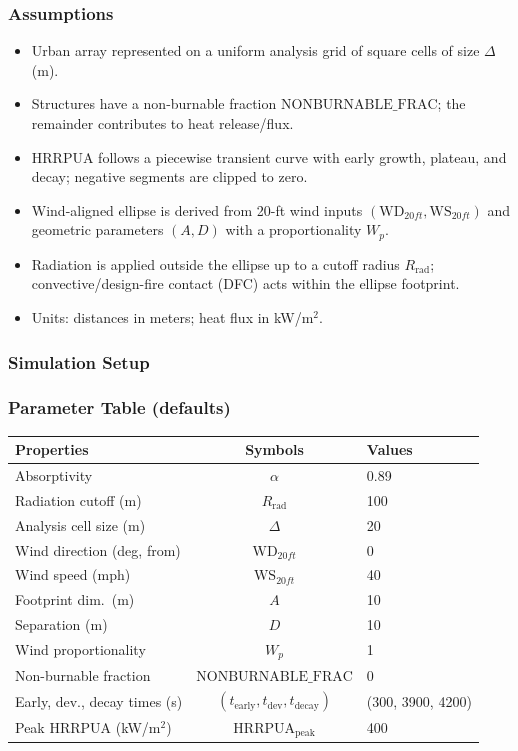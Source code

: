 \documentclass[../report/case_report.tex]{subfiles}
\begin{document}
\subsubsection{Assumptions}
\begin{itemize}[nosep]
  \item Urban array represented on a uniform analysis grid of square cells of size $\Delta$ (m).
  \item Structures have a non-burnable fraction $\mathrm{NONBURNABLE\_FRAC}$; the remainder contributes to heat release/flux.
  \item HRRPUA follows a piecewise transient curve with early growth, plateau, and decay; negative segments are clipped to zero.
  \item Wind-aligned ellipse is derived from 20-ft wind inputs $(\mathrm{WD}_{20ft}, \mathrm{WS}_{20ft})$ and geometric parameters $(A,D)$ with a proportionality $W_p$.
  \item Radiation is applied outside the ellipse up to a cutoff radius $R_{\mathrm{rad}}$; convective/design-fire contact (DFC) acts within the ellipse footprint.
  \item Units: distances in meters; heat flux in kW/m$^2$.
\end{itemize}

\subsubsection{Simulation Setup}
\subsubsection*{Parameter Table (defaults)}
\begin{center}
\small
\begin{tabular}{lcl}
\toprule
Properties & Symbols & Values \\
\hline
Absorptivity & $\alpha$ & 0.89 \\
Radiation cutoff (m) & $R_{\mathrm{rad}}$ & 100 \\
Analysis cell size (m) & $\Delta$ & 20 \\
Wind direction (deg, from) & $\mathrm{WD}_{20ft}$ & 0 \\
Wind speed (mph) & $\mathrm{WS}_{20ft}$ & 40 \\
Footprint dim.\ (m) & $A$ & 10 \\
Separation (m) & $D$ & 10 \\
Wind proportionality & $W_p$ & 1 \\
Non-burnable fraction & $\mathrm{NONBURNABLE\_FRAC}$ & 0 \\
Early, dev., decay times (s) & $(t_{\mathrm{early}}, t_{\mathrm{dev}}, t_{\mathrm{decay}})$ & (300, 3900, 4200) \\
Peak HRRPUA (kW/m$^2$) & $\mathrm{HRRPUA_{peak}}$ & 400 \\
\bottomrule
\end{tabular}
\end{center}
\end{document}
